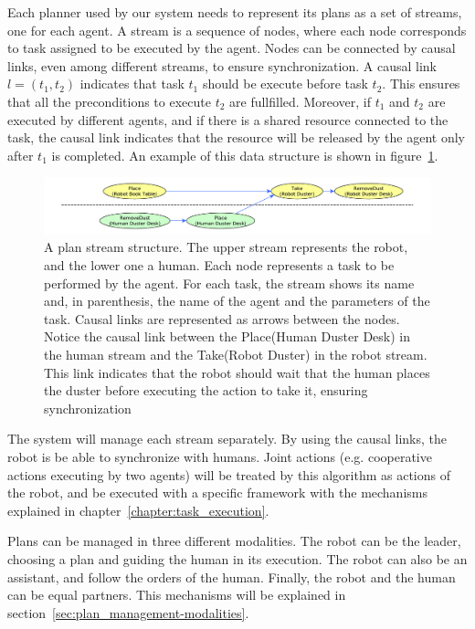 Each planner used by our system needs to represent its plans as a set of streams, one for each agent. A stream is a sequence of nodes, where each node corresponds to task assigned to be executed by the agent. Nodes can be connected by causal links, even among different streams, to ensure synchronization. A causal link $l=(t_1,t_2)$ indicates that  task $t_1$ should be execute before task $t_2$. This ensures that all the preconditions to execute $t_2$ are fullfilled. Moreover, if $t_1$ and $t_2$ are executed by different agents, and if there is a shared resource connected to the task, the causal link indicates that the resource will be released by the agent only after $t_1$ is completed. An example of this data structure is shown in figure~\ref{fig:plan_management-streams}.

\begin{figure}[ht!]
 \centering
  \includegraphics[scale=0.45]{img/coworker/plan_management/streams.pdf}
 \caption[Plan data structures]{
 A plan stream structure. The upper stream represents the robot, and the lower one a human. Each node represents a task to be performed by the agent. For each task, the stream shows its name and, in parenthesis, the name of the agent and the parameters of the task. Causal links are represented as arrows between the nodes. Notice the causal link between the Place(Human Duster Desk) in the human stream and the Take(Robot Duster) in the robot stream. This link indicates that the robot should wait that the human places the duster before executing the action to take it, ensuring synchronization }
 \label{fig:plan_management-streams}
 \end{figure}

The system will manage each stream separately. By using the causal links, the robot is be able to synchronize with humans. Joint actions (e.g. cooperative actions executing by two agents) will be treated by this algorithm as actions of the robot, and be executed with a specific framework with the mechanisms explained in chapter~\ref{chapter:task_execution}.

Plans can be managed in three different modalities. The robot can be the leader, choosing a plan and guiding the human in its execution. The robot can also be an assistant, and follow the orders of the human. Finally, the robot and the human can be equal partners. This mechanisms will be explained in section~\ref{sec:plan_management-modalities}.



